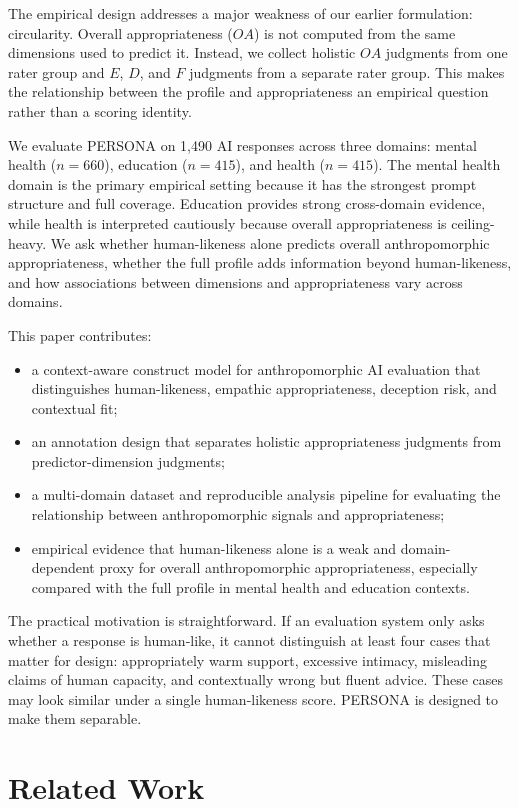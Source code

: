 \documentclass[manuscript,review,anonymous]{acmart}
\begin{document}
The empirical design addresses a major weakness of our earlier formulation: circularity. Overall appropriateness ($OA$) is not computed from the same dimensions used to predict it. Instead, we collect holistic $OA$ judgments from one rater group and $E$, $D$, and $F$ judgments from a separate rater group. This makes the relationship between the profile and appropriateness an empirical question rather than a scoring identity.

We evaluate PERSONA on 1,490 AI responses across three domains: mental health ($n=660$), education ($n=415$), and health ($n=415$). The mental health domain is the primary empirical setting because it has the strongest prompt structure and full coverage. Education provides strong cross-domain evidence, while health is interpreted cautiously because overall appropriateness is ceiling-heavy. We ask whether human-likeness alone predicts overall anthropomorphic appropriateness, whether the full profile adds information beyond human-likeness, and how associations between dimensions and appropriateness vary across domains.

This paper contributes:
\begin{itemize}
  \item a context-aware construct model for anthropomorphic AI evaluation that distinguishes human-likeness, empathic appropriateness, deception risk, and contextual fit;
  \item an annotation design that separates holistic appropriateness judgments from predictor-dimension judgments;
  \item a multi-domain dataset and reproducible analysis pipeline for evaluating the relationship between anthropomorphic signals and appropriateness;
  \item empirical evidence that human-likeness alone is a weak and domain-dependent proxy for overall anthropomorphic appropriateness, especially compared with the full profile in mental health and education contexts.
\end{itemize}

The practical motivation is straightforward. If an evaluation system only asks whether a response is human-like, it cannot distinguish at least four cases that matter for design: appropriately warm support, excessive intimacy, misleading claims of human capacity, and contextually wrong but fluent advice. These cases may look similar under a single human-likeness score. PERSONA is designed to make them separable.

\section{Related Work}
\end{document}
